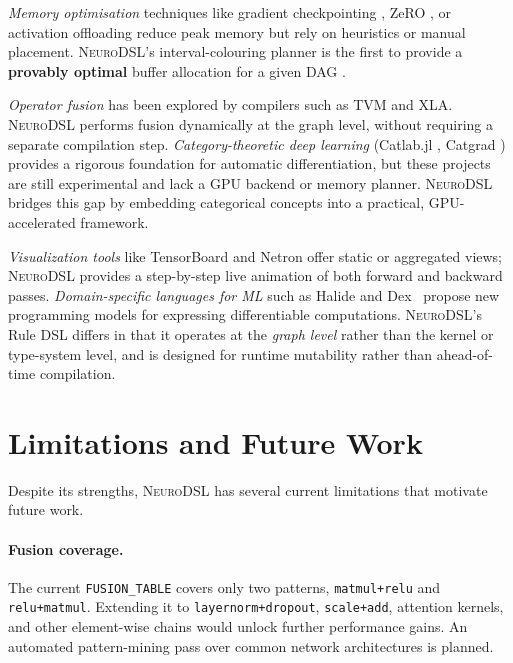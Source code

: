 \documentclass{article}
\begin{document}
\textit{Memory optimisation} techniques like gradient checkpointing \cite{checkpointing}, ZeRO \cite{zero}, or activation offloading \cite{vdnn} reduce peak memory but rely on heuristics or manual placement. \textsc{NeuroDSL}'s interval-colouring planner is the first to provide a \textbf{provably optimal} buffer allocation for a given DAG \cite{dilworth}.

\textit{Operator fusion} has been explored by compilers such as TVM \cite{tvm} and XLA. \textsc{NeuroDSL} performs fusion dynamically at the graph level, without requiring a separate compilation step. \textit{Category-theoretic deep learning} (Catlab.jl \cite{catlab}, Catgrad \cite{catgrad}) provides a rigorous foundation for automatic differentiation, but these projects are still experimental and lack a GPU backend or memory planner. \textsc{NeuroDSL} bridges this gap by embedding categorical concepts into a practical, GPU-accelerated framework.

\textit{Visualization tools} like TensorBoard \cite{tensorboard} and Netron \cite{netron} offer static or aggregated views; \textsc{NeuroDSL} provides a step-by-step live animation of both forward and backward passes. \textit{Domain-specific languages for ML} such as Halide \cite{halide} and Dex~\cite{dex} propose new programming models for expressing differentiable computations. \textsc{NeuroDSL}'s Rule DSL differs in that it operates at the \emph{graph level} rather than the kernel or type-system level, and is designed for runtime mutability rather than ahead-of-time compilation.

\section{Limitations and Future Work}
\label{sec:limitations}

Despite its strengths, \textsc{NeuroDSL} has several current limitations that motivate future work.
\paragraph{Fusion coverage.} The current \texttt{FUSION\_TABLE} covers only two patterns, \texttt{matmul+relu} and \texttt{relu+matmul}. Extending it to \texttt{layernorm+dropout}, \texttt{scale+add}, attention kernels, and other element-wise chains would unlock further performance gains. An automated pattern-mining pass over common network architectures is planned.
\end{document}

